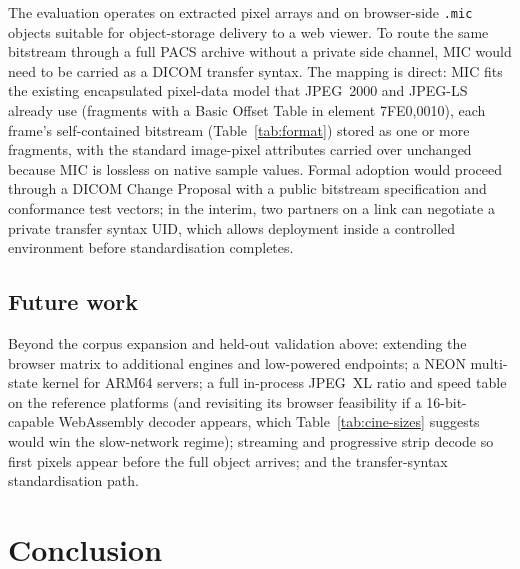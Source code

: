 \documentclass[journal]{IEEEtran}
\begin{document}
The evaluation operates on extracted pixel arrays and on browser-side
\texttt{.mic} objects suitable for object-storage delivery to a web viewer.
To route the same bitstream through a full PACS archive without a private
side channel, MIC would need to be carried as a DICOM transfer syntax. The
mapping is direct: MIC fits the existing encapsulated pixel-data model that
JPEG~2000 and JPEG-LS already use (fragments with a Basic Offset Table in
element 7FE0,0010), each frame's self-contained bitstream
(Table~\ref{tab:format}) stored as one or more fragments, with the standard
image-pixel attributes carried over unchanged because MIC is lossless on
native sample values. Formal adoption would proceed through a DICOM Change
Proposal with a public bitstream specification and conformance test vectors;
in the interim, two partners on a link can negotiate a private transfer
syntax UID, which allows deployment inside a controlled environment before
standardisation completes.

\subsection{Future work}

Beyond the corpus expansion and held-out validation above: extending the
browser matrix to additional engines and low-powered endpoints; a NEON
multi-state kernel for ARM64 servers; a full in-process JPEG~XL ratio and
speed table on the reference platforms (and revisiting its browser
feasibility if a 16-bit-capable WebAssembly decoder appears, which
Table~\ref{tab:cine-sizes} suggests would win the slow-network regime);
streaming and progressive strip decode so first pixels appear before the
full object arrives; and the transfer-syntax standardisation path.

\section{Conclusion}
\label{sec:conclusion}
\end{document}
